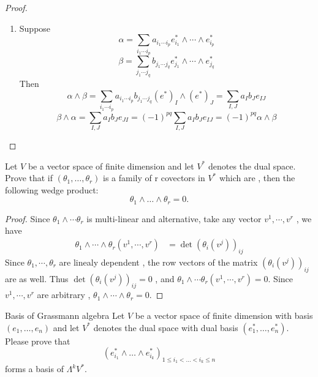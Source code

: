 \documentclass[../main.tex]{subfiles}
\begin{document}
\begin{proof}
\begin{enumerate}
\[\begin{aligned}
    \end{aligned}
     \]
     \item Suppose \[
     \alpha =  \sum _{i_1 \cdots i_{p}}a_{i_1\cdots i_{p}}e_{i_1}^{*}\wedge \cdots \wedge e_{i_{p}}^{*}
     \]  \[
     \beta = \sum _{j_1\cdots j_{q}} b_{j_1\cdots j_{q}} e_{j_1}^{*}\wedge \cdots \wedge e_{j_{q}}^{*}
     \] Then \[
     \alpha \wedge \beta =  \sum _{i_1\cdots i_{p}} a_{i_1\cdots i_{p}}b_{j_1\cdots j_{q}}\left( e^{*} \right)_{I} \wedge \left( e^{*} \right)_{J}= \sum _{I,J} a_{I}b_{J} e_{IJ}  
     \] \[
     \beta \wedge {\alpha }= \sum _{I,J} a_{I}b_{J}e_{JI}= \left( -1 \right)^{pq} \sum _{I,J}a_{I}b_{J}e_{IJ} = \left( -1 \right)^{pq}\alpha \wedge \beta  
     \]
   \end{enumerate}
   
\end{proof}
    

\begin{exercise}{}{}
Let $V$ be a vector space of finite dimension and let $V^*$ denotes the dual space. Prove that if $(\theta_1, \dots, \theta_r)$ is a family of r covectors in $V^*$ which are , then the following wedge product:
\[
\theta_1 \wedge \dots \wedge \theta_r = 0.
\]
\end{exercise}


\begin{proof}
    
    Since \(   \theta _1 \wedge \cdots  \theta _{r}  \) is multi-linear and alternative,  take any vector \(   v^1,\cdots,v^r   \) , we have \[
    \begin{aligned}
    \theta _1 \wedge \cdots \wedge  \theta _{r}\left(  v^1,\cdots,v^r  \right)&= \det \left(  \theta _{i}\left( v^{j} \right)  \right) _{ij}
    \end{aligned} 
    \]  Since \(   \theta _1 ,\cdots , \theta _{r}  \) are linealy dependent , the  row vectors of the matrix  \(  \left(  \theta _{i}\left( v^{j} \right)  \right)_{ij}   \) are as well. Thus \(  \det \left(  \theta _{i}\left( v^{j} \right)  \right)_{ij}= 0   \) , and \(   \theta _1 \wedge \cdots  \theta _{r}\left(  v^1,\cdots,v^r  \right)= 0   \).    Since \(   v^1,\cdots,v^r   \) are arbitrary ,  \(   \theta _1 \wedge \cdots \wedge  \theta _{r}= 0  \).   
\end{proof}

\begin{exercise}{Basis of Grassmann algebra}{}
Let $V$ be a vector space of finite dimension with basis $(e_1, \dots, e_n)$ and let $V^*$ denotes the dual space with dual basis $(e_1^*, \dots, e_n^*)$. Please prove that
\[ (e_{i_1}^* \wedge \dots \wedge e_{i_k}^*)_{1 \le i_1 < \dots < i_k \le n} \]
forms a basis of $\Lambda^k V^*$.
\end{exercise}
\end{document}
